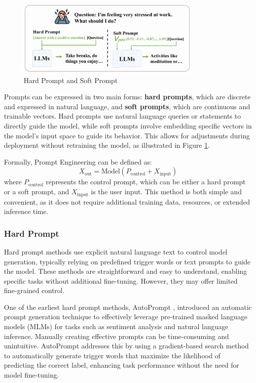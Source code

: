 \documentclass[acmsmall, screen]{acmart}
\begin{document}
\begin{figure}[h]
    \centering
    \includegraphics[width=0.8\textwidth]{figures/prompt.pdf}
    \caption{Hard Prompt and Soft Prompt}
    \label{fig:prompt}
\end{figure}

Prompts can be expressed in two main forms: \textbf{hard prompts}, which are discrete and expressed in natural language, and \textbf{soft prompts}, which are continuous and trainable vectors. Hard prompts use natural language queries or statements to directly guide the model, while soft prompts involve embedding specific vectors in the model's input space to guide its behavior. This allows for adjustments during deployment without retraining the model, as illustrated in Figure \ref{fig:prompt}.

Formally, Prompt Engineering can be defined as:
\begin{equation}
X_{\text{out}} = \text{Model}(P_{\text{control}} + X_{\text{input}})
\end{equation}
where \( P_{\text{control}} \) represents the control prompt, which can be either a hard prompt or a soft prompt, and \( X_{\text{input}} \) is the user input. This method is both simple and convenient, as it does not require additional training data, resources, or extended inference time.


\subsubsection{\textbf{Hard Prompt}} 
Hard prompt methods use explicit natural language text to control model generation, typically relying on predefined trigger words or text prompts to guide the model. These methods are straightforward and easy to understand, enabling specific tasks without additional fine-tuning. However, they may offer limited fine-grained control.

One of the earliest hard prompt methods, AutoPrompt \cite{shin_emnlp20_Autoprompt}, introduced an automatic prompt generation technique to effectively leverage pre-trained masked language models (MLMs) for tasks such as sentiment analysis and natural language inference. Manually creating effective prompts can be time-consuming and unintuitive. AutoPrompt addresses this by using a gradient-based search method to automatically generate trigger words that maximize the likelihood of predicting the correct label, enhancing task performance without the need for model fine-tuning.
\end{document}
